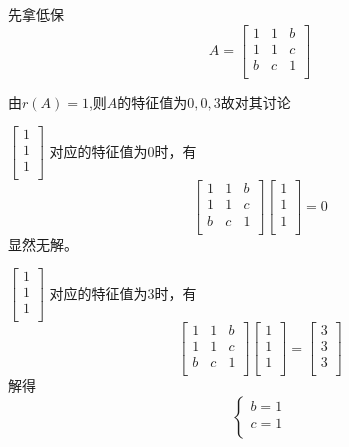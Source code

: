 \documentclass[lang=cn,10pt]{elegantbook}
\begin{document}
\begin{solution}
	
	先拿低保
	\begin{equation*}
		A=\left[ \begin{matrix}
			1&		1&		b\\
			1&		1&		c\\
			b&		c&		1\\
		\end{matrix} \right]
	\end{equation*}
	
	由$r(A)=1$,则$A$的特征值为$0,0,3$故对其讨论
	
	$\left[ \begin{array}{c}
		1\\
		1\\
		1\\
	\end{array} \right]$ 对应的特征值为0时，有
	\begin{equation*}
		\left[ \begin{matrix}
			1&		1&		b\\
			1&		1&		c\\
			b&		c&		1\\
		\end{matrix} \right]\left[ \begin{array}{c}
		1\\
		1\\
		1\\
		\end{array} \right]=0
	\end{equation*}
	显然无解。
		
		$\left[ \begin{array}{c}
		1\\
		1\\
		1\\
	\end{array} \right]$ 对应的特征值为3时，有
	\begin{equation*}
		\left[ \begin{matrix}
			1&		1&		b\\
			1&		1&		c\\
			b&		c&		1\\
		\end{matrix} \right]\left[ \begin{array}{c}
			1\\
			1\\
			1\\
		\end{array} \right]=\left[ \begin{array}{c}
		3\\
		3\\
		3\\
		\end{array} \right]
	\end{equation*}
	解得
	\begin{equation*}
		\begin{cases}
			b=1\\
			c=1\\
		\end{cases}
	\end{equation*}
\end{solution}
\end{document}
